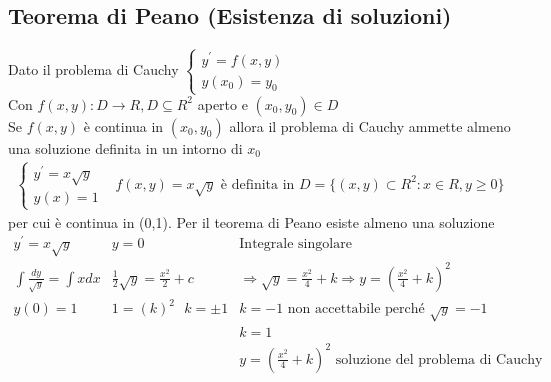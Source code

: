 \subsection{Teorema di Peano (Esistenza di soluzioni)}
\begin{teorema}
  Dato il problema di Cauchy $\begin{cases} y^\prime=f(x,y)\\ y(x_0)=y_0\end{cases}$\\
  Con $f(x,y):D \to R, D \subseteq R^2$ aperto e $(x_0,y_0)\in D$\\
  Se $f(x,y)$ è continua in $(x_0,y_0)$ allora il problema di Cauchy ammette almeno una
  soluzione definita in un intorno di $x_0$
  \begin{eqnarray*}
    \begin{cases}
      y^\prime=x\sqrt{y}\\
      y(x)=1
    \end{cases}& f(x,y)=x\sqrt{y} \text{ è definita in } D=\{(x,y)\subset R^2:x\in R,
    y\geq 0\}
  \end{eqnarray*}
  per cui è continua in (0,1). Per il teorema di Peano esiste almeno una soluzione
  \begin{eqnarray*}
    y^\prime=x\sqrt{y} & y=0 & \text{Integrale singolare}\\
    \int \frac{dy}{\sqrt{y}} =\int xdx& \frac{1}{2} \sqrt{y}=\frac{x^2}{2}+c
                             & \Rightarrow \sqrt{y}=\frac{x^2}{4}+k \Rightarrow y=\left(
                               \frac{x^2}{4}+k\right)^2\\
    y(0)=1 & 1=(k)^2\text{ } k=\pm 1 & k=-1 \text{ non accettabile perché } \sqrt{y}=-1\\
    && k=1\\
    && y=\left(\frac{x^2}{4}+k\right)^2 \text{ soluzione del problema di Cauchy}
  \end{eqnarray*}
\end{teorema}
